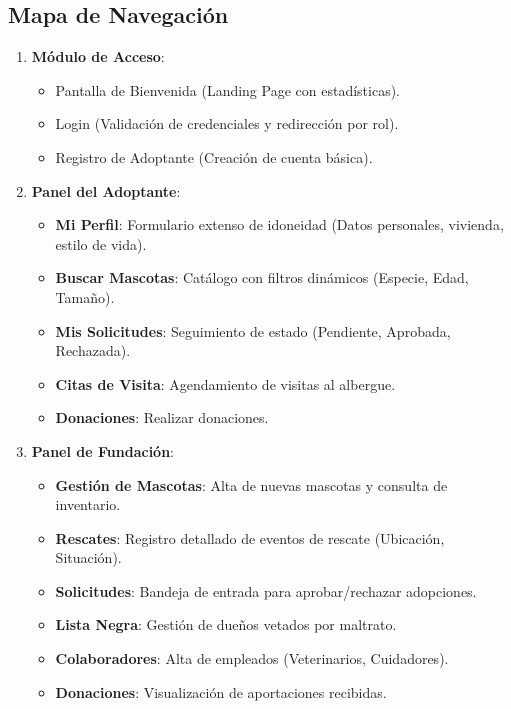 \documentclass[12pt,a4paper]{article}
\begin{document}
\subsection{Mapa de Navegación}
\begin{enumerate}
    \item \textbf{Módulo de Acceso}:
    \begin{itemize}
        \item Pantalla de Bienvenida (Landing Page con estadísticas).
        \item Login (Validación de credenciales y redirección por rol).
        \item Registro de Adoptante (Creación de cuenta básica).
    \end{itemize}
    
    \item \textbf{Panel del Adoptante}:
    \begin{itemize}
        \item \textbf{Mi Perfil}: Formulario extenso de idoneidad (Datos personales, vivienda, estilo de vida).
        \item \textbf{Buscar Mascotas}: Catálogo con filtros dinámicos (Especie, Edad, Tamaño).
        \item \textbf{Mis Solicitudes}: Seguimiento de estado (Pendiente, Aprobada, Rechazada).
        \item \textbf{Citas de Visita}: Agendamiento de visitas al albergue.
        \item \textbf{Donaciones}: Realizar donaciones.
    \end{itemize}

    \item \textbf{Panel de Fundación}:
    \begin{itemize}
        \item \textbf{Gestión de Mascotas}: Alta de nuevas mascotas y consulta de inventario.
        \item \textbf{Rescates}: Registro detallado de eventos de rescate (Ubicación, Situación).
        \item \textbf{Solicitudes}: Bandeja de entrada para aprobar/rechazar adopciones.
        \item \textbf{Lista Negra}: Gestión de dueños vetados por maltrato.
        \item \textbf{Colaboradores}: Alta de empleados (Veterinarios, Cuidadores).
        \item \textbf{Donaciones}: Visualización de aportaciones recibidas.
    \end{itemize}
\end{enumerate}
\end{document}
